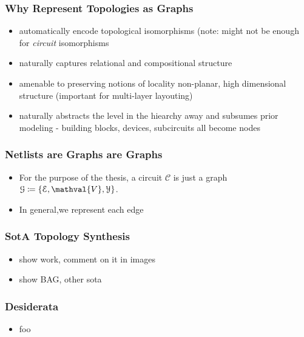 \documentclass[./presentation.tex]{subfiles}
\begin{document}
\begin{frame}[label=todo]
\frametitle{Why Represent Topologies as Graphs}
\begin{itemize}
  \item automatically encode topological isomorphisms (note: might not be enough for \emph{circuit} isomorphisms \cite{wangFunctionalityMattersNetlist2022c}
  \item naturally captures relational and compositional structure
  \item amenable to preserving notions of locality non-planar, high dimensional structure (important for multi-layer layouting)
  \item naturally abstracts the level in the hiearchy away and subsumes prior modeling - building blocks, devices, subcircuits all become nodes
\end{itemize}
\end{frame}

\begin{frame}[label=working]
  \frametitle{Netlists are Graphs are Graphs}
  \begin{itemize}
    \item For the purpose of the thesis, a circuit $\mathcal{C}$ is just a graph $\mathcal{G}\coloneq \lbrace\mathcal{E},\mathval{V},\mathcal{Y} \rbrace$.
    \item In general,we represent each edge 
  \end{itemize}
\end{frame}

\begin{frame}[label=working]
\frametitle{SotA Topology Synthesis}
\begin{itemize}
  \item show \cite{zhaoAutomatedTopologySynthesis2022a} work, comment on it in images
  \item show BAG, other sota
\end{itemize}
\end{frame}

\begin{frame}[label=working]
\frametitle{Desiderata}
\begin{itemize}
  \item foo
\end{itemize}
\end{frame}

  
\end{document}
